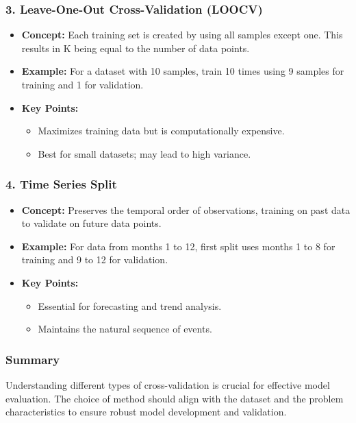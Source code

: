 \documentclass{beamer}
\begin{document}
\begin{frame}[fragile]
    \frametitle{3. Leave-One-Out Cross-Validation (LOOCV)}
    \begin{itemize}
        \item \textbf{Concept:} Each training set is created by using all samples except one. This results in K being equal to the number of data points.
        \item \textbf{Example:} For a dataset with 10 samples, train 10 times using 9 samples for training and 1 for validation.
        \item \textbf{Key Points:}
            \begin{itemize}
                \item Maximizes training data but is computationally expensive.
                \item Best for small datasets; may lead to high variance.
            \end{itemize}
    \end{itemize}
\end{frame}

\begin{frame}[fragile]
    \frametitle{4. Time Series Split}
    \begin{itemize}
        \item \textbf{Concept:} Preserves the temporal order of observations, training on past data to validate on future data points.
        \item \textbf{Example:} For data from months 1 to 12, first split uses months 1 to 8 for training and 9 to 12 for validation.
        \item \textbf{Key Points:}
            \begin{itemize}
                \item Essential for forecasting and trend analysis.
                \item Maintains the natural sequence of events.
            \end{itemize}
    \end{itemize}
\end{frame}

\begin{frame}[fragile]
    \frametitle{Summary}
    Understanding different types of cross-validation is crucial for effective model evaluation. The choice of method should align with the dataset and the problem characteristics to ensure robust model development and validation.
\end{frame}
\end{document}
